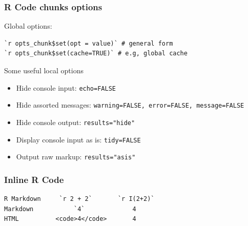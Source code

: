 \begin{frame}[fragile]\frametitle{R Code chunks options}

\begin{block}{Global options:}

\begin{verbatim}
`r opts_chunk$set(opt = value)` # general form
`r opts_chunk$set(cache=TRUE)` # e.g, global cache
\end{verbatim}

\end{block}

\begin{block}{Some useful local options}

\begin{itemize}
\item
  Hide console input: \texttt{echo=FALSE}
\item
  Hide assorted messages:
  \texttt{warning=FALSE, error=FALSE, message=FALSE}
\item
  Hide console output: \texttt{results="hide"}
\item
  Display console input as is: \texttt{tidy=FALSE}
\item
  Output raw markup: \texttt{results="asis"}
\end{itemize}

\end{block}

\end{frame}

\begin{frame}[fragile]\frametitle{Inline R Code}

\begin{verbatim}
R Markdown     `r 2 + 2`       `r I(2+2)`
Markdown           `4`             4
HTML          <code>4</code>       4
\end{verbatim}

\end{frame}

